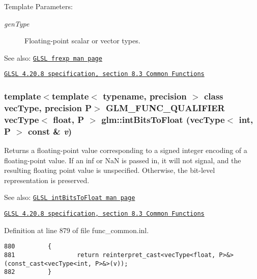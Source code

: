 \begin{Desc}
\item[Template Parameters:]
\begin{description}
\item[{\em genType}]Floating-point scalar or vector types.\end{description}
\end{Desc}
\begin{Desc}
\item[See also:]\href{http://www.opengl.org/sdk/docs/manglsl/xhtml/frexp.xml}{\tt GLSL frexp man page} 

\href{http://www.opengl.org/registry/doc/GLSLangSpec.4.20.8.pdf}{\tt GLSL 4.20.8 specification, section 8.3 Common Functions} \end{Desc}
\hypertarget{group__core__func__common_gb3619a03062573cb024a4deed71e21dc}{
\subsubsection[intBitsToFloat]{\setlength{\rightskip}{0pt plus 5cm}template$<$template$<$ typename, precision $>$ class vecType, precision P$>$ GLM\_\-FUNC\_\-QUALIFIER vecType$<$ float, P $>$ glm::intBitsToFloat (vecType$<$ int, P $>$ const \& {\em v})}}
\label{group__core__func__common_gb3619a03062573cb024a4deed71e21dc}


Returns a floating-point value corresponding to a signed integer encoding of a floating-point value. If an inf or NaN is passed in, it will not signal, and the resulting floating point value is unspecified. Otherwise, the bit-level representation is preserved.

\begin{Desc}
\item[See also:]\href{http://www.opengl.org/sdk/docs/manglsl/xhtml/intBitsToFloat.xml}{\tt GLSL intBitsToFloat man page} 

\href{http://www.opengl.org/registry/doc/GLSLangSpec.4.20.8.pdf}{\tt GLSL 4.20.8 specification, section 8.3 Common Functions} \end{Desc}


Definition at line 879 of file func\_\-common.inl.

\begin{Code}\begin{verbatim}880         {
881                 return reinterpret_cast<vecType<float, P>&>(const_cast<vecType<int, P>&>(v));
882         }
\end{verbatim}
\end{Code}


